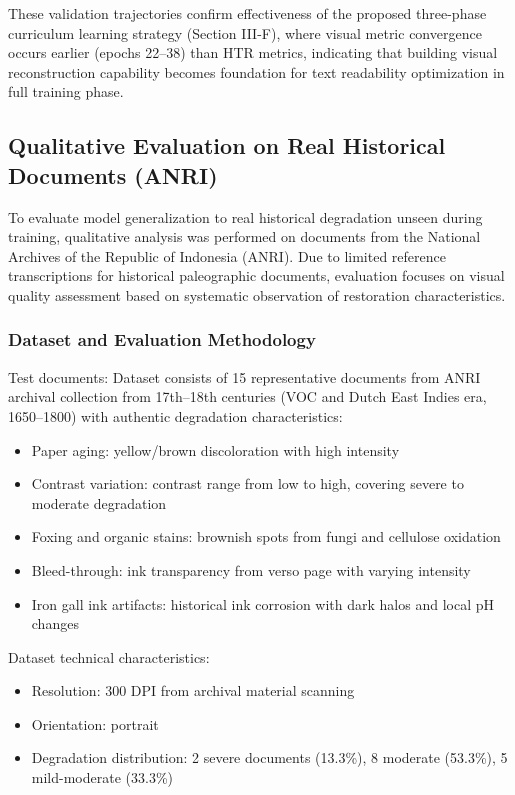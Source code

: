 \documentclass[journal]{IEEEtran}
\begin{document}
These validation trajectories confirm effectiveness of the proposed three-phase curriculum learning strategy (Section III-F), where visual metric convergence occurs earlier (epochs 22--38) than HTR metrics, indicating that building visual reconstruction capability becomes foundation for text readability optimization in full training phase.

\subsection{Qualitative Evaluation on Real Historical Documents (ANRI)}

To evaluate model generalization to real historical degradation unseen during training, qualitative analysis was performed on documents from the National Archives of the Republic of Indonesia (ANRI). Due to limited reference transcriptions for historical paleographic documents, evaluation focuses on visual quality assessment based on systematic observation of restoration characteristics.

\subsubsection{Dataset and Evaluation Methodology}

Test documents: Dataset consists of 15 representative documents from ANRI archival collection from 17th--18th centuries (VOC and Dutch East Indies era, 1650--1800) with authentic degradation characteristics:
\begin{itemize}
    \item Paper aging: yellow/brown discoloration with high intensity
    \item Contrast variation: contrast range from low to high, covering severe to moderate degradation
    \item Foxing and organic stains: brownish spots from fungi and cellulose oxidation
    \item Bleed-through: ink transparency from verso page with varying intensity
    \item Iron gall ink artifacts: historical ink corrosion with dark halos and local pH changes
\end{itemize}

Dataset technical characteristics:
\begin{itemize}
    \item Resolution: 300 DPI from archival material scanning
    \item Orientation: portrait
    \item Degradation distribution: 2 severe documents (13.3\%), 8 moderate (53.3\%), 5 mild-moderate (33.3\%)
\end{itemize}
\end{document}
